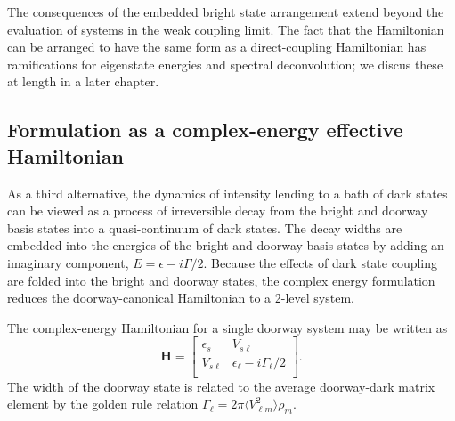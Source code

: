 \documentclass[12pt]{mitthesis}
\begin{document}
The consequences of the embedded bright state arrangement extend
beyond the evaluation of systems in the weak coupling limit.  The fact
that the Hamiltonian can be arranged to have the same form as a
direct-coupling Hamiltonian has ramifications for eigenstate energies
and spectral deconvolution; we discus these at length in a later
chapter.

\subsection{Formulation as a complex-energy effective
  Hamiltonian}
\label{sec:complex-energy}

As a third alternative, the dynamics of intensity lending to a bath of
dark states can be viewed as a process of irreversible decay from the
bright and doorway basis states into a quasi-continuum of dark
states. The decay widths are embedded into the energies of the bright
and doorway basis states by adding an imaginary component, $E =
\epsilon -i \Gamma / 2$. Because the effects of dark state coupling
are folded into the bright and doorway states, the complex energy
formulation reduces the doorway-canonical Hamiltonian to a 2-level
system.

The complex-energy Hamiltonian for a single doorway system may be
written as
\begin{equation}
  \label{eq:complex-h}
  \mathbf{H} = 
  \begin{bmatrix}
    \epsilon_s & V_{s\ell} \\
    V_{s\ell} & \epsilon_{\ell} - i \Gamma_{\ell} / 2 \\
  \end{bmatrix}.
\end{equation}
The width of the doorway state is related to the average doorway-dark
matrix element by the golden rule relation $\Gamma_{\ell} = 2 \pi \langle
V_{\ell m}^2 \rangle \rho_{m}$.
\end{document}
